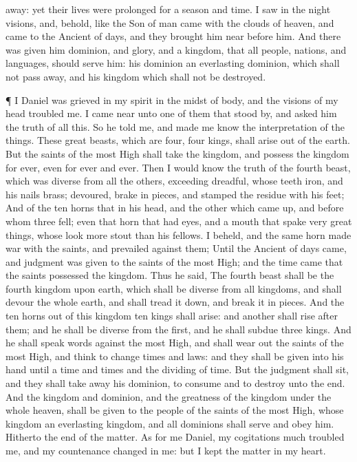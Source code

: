 {away: yet their
lives were
prolonged
for a
season and
time.
I
saw in the
night
visions, and,
behold,
{} like the
Son of
man
came
with the
clouds of
heaven, and
came
to the
Ancient of
days, and they brought him
near
before him.
And there was
given him
dominion, and
glory, and a
kingdom, that
all
people,
nations, and
languages, should
serve him: his
dominion
{} an
everlasting
dominion, which shall
not pass
away, and his
kingdom
{} which shall
not be
destroyed.
\par }{\PP {}¶
I
Daniel was
grieved in my
spirit in the
midst of
{}
body, and the
visions of my
head
troubled me.
I came
near
unto
one
of them that stood
by, and
asked
him the
truth of
all
this. So he
told me, and made me
know the
interpretation of the
things.
These
great
beasts,
which are
four,
{}
four
kings,
{} shall
arise out
of the
earth.
But the
saints of the most
High shall
take the
kingdom, and
possess the
kingdom
for
ever, even
for
ever and
ever.
Then I
would know the
truth
of the
fourth
beast, which
was
diverse
from
all the others,
exceeding
dreadful, whose
teeth
{}
iron, and his
nails
{}
brass;
{}
devoured, brake in
pieces, and
stamped the
residue with his
feet;
And
of the
ten
horns that
{} in his
head, and
{} the
other which came
up, and
before whom
three
fell; even
{} that
horn
that had
eyes, and a
mouth that
spake very great
things, whose
look
{}
more
stout
than his
fellows.
I
beheld, and the
same
horn
made
war
with the
saints, and
prevailed against them;
Until the
Ancient of
days
came, and
judgment was
given to the
saints of the most
High; and the
time
came that the
saints
possessed the
kingdom.
Thus he
said, The
fourth
beast shall
be the
fourth
kingdom upon
earth, which shall be
diverse
from
all
kingdoms, and shall
devour the
whole
earth, and shall tread it
down, and break it in
pieces.
And the
ten
horns out
of this
kingdom
{}
ten
kings
{} shall
arise: and
another shall
rise
after them; and he shall be
diverse
from the
first, and he shall
subdue
three
kings.
And he shall
speak
{}
words
against the most
High, and shall wear
out the
saints of the most
High, and
think to
change
times and
laws: and they shall be
given into his
hand
until a
time and
times and the
dividing of
time.
But the
judgment shall
sit, and they shall take
away his
dominion, to
consume and to
destroy
{}
unto the
end.
And the
kingdom and
dominion, and the
greatness of the
kingdom
under the
whole
heaven, shall be
given to the
people of the
saints of the most
High, whose
kingdom
{} an
everlasting
kingdom, and
all
dominions shall
serve and
obey him.
Hitherto
{} the
end of the
matter. As for
me
Daniel, my
cogitations
much
troubled me, and my
countenance
changed in
me: but I
kept the
matter in my
heart.

}
